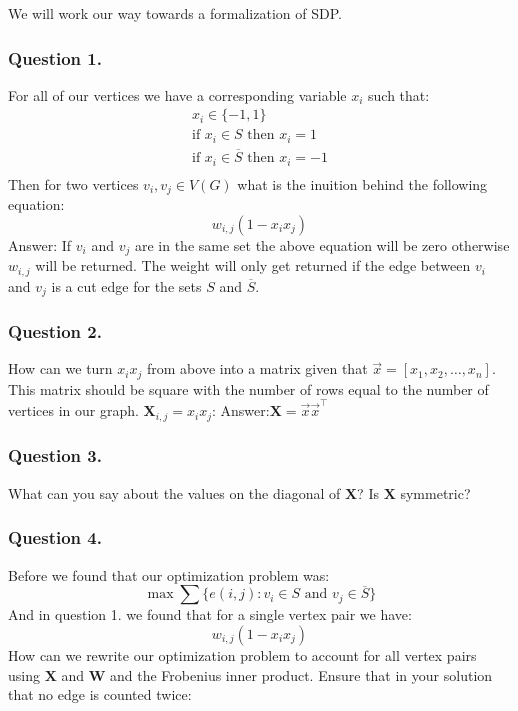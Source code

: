 \documentclass{article}
\begin{document}
We will work our way towards a formalization of SDP.
\subsubsection{Question 1.}
For all of our vertices we have a corresponding variable \( x_i \) such that:
\begin{gather*}
x_i \in \{ -1, 1 \} \\
\text{if } x_i \in S \text{ then } x_i = 1 \\
\text{if } x_i \in \overline{S} \text{ then } x_i = -1 \\
\end{gather*}
Then for two vertices \( v_i, v_j \in V(G) \) what is the inuition behind the following equation:
\[
w_{i, j}(1 - x_i x_j)
\]
Answer: If \( v_i \) and \( v_j \) are in the same set the above equation will be zero otherwise \( w_{i, j} \) will be returned. The weight will only get returned if the edge between \( v_i \) and \( v_j \) is a cut edge for the sets \( S \) and \( \overline{S} \).

\subsubsection{Question 2.}
How can we turn \( x_i x_j \) from above into a matrix given that \( \vec{x} = [x_1, x_2, \ldots, x_n] \). This matrix should be square with the number of rows equal to the number of vertices in our graph. \( \mathbf{X}_{i, j} = x_i x_j \):
Answer:\( \mathbf{X} = \vec{x} \vec{x}^\top \)

\subsubsection{Question 3.}
What can you say about the values on the diagonal of \( \mathbf{X} \)? Is \( \mathbf{X} \) symmetric?

\subsubsection{Question 4.}
Before we found that our optimization problem was:
\[
  \max \sum \{ e(i, j): v_i \in S \text{ and } v_j \in \overline{S} \}
\]
And in question 1. we found that for a single vertex pair we have:
\[
w_{i, j}(1 - x_i x_j)
\]
How can we rewrite our optimization problem to account for all vertex pairs using \( \mathbf{X} \) and \( \mathbf{W} \) and the Frobenius inner product.
Ensure that in your solution that no edge is counted twice:
\end{document}
